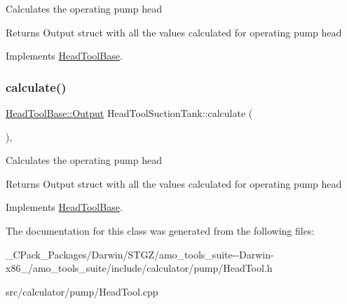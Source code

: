 Calculates the operating pump head \begin{DoxyReturn}{Returns}
Output struct with all the values calculated for operating pump head 
\end{DoxyReturn}


Implements \hyperlink{class_head_tool_base_a82024c0ce01699aa24509c964267c392}{Head\+Tool\+Base}.

\mbox{\label{class_head_tool_suction_tank_ad91b31b9f524b9892da26e5ecb9e191e}} 
\subsubsection{\texorpdfstring{calculate()}{calculate()}\hspace{0.1cm}{\footnotesize\ttfamily [3/3]}}
{\footnotesize\ttfamily \hyperlink{struct_head_tool_base_1_1_output}{Head\+Tool\+Base\+::\+Output} Head\+Tool\+Suction\+Tank\+::calculate (\begin{DoxyParamCaption}{ }\end{DoxyParamCaption})\hspace{0.3cm}{\ttfamily [override]}, {\ttfamily [virtual]}}

Calculates the operating pump head \begin{DoxyReturn}{Returns}
Output struct with all the values calculated for operating pump head 
\end{DoxyReturn}


Implements \hyperlink{class_head_tool_base_a82024c0ce01699aa24509c964267c392}{Head\+Tool\+Base}.



The documentation for this class was generated from the following files\+:\begin{DoxyCompactItemize}
\item 
\+\_\+\+C\+Pack\+\_\+\+Packages/\+Darwin/\+S\+T\+G\+Z/amo\+\_\+tools\+\_\+suite-\/-\/\+Darwin-\/x86\+\_/amo\+\_\+tools\+\_\+suite/include/calculator/pump/Head\+Tool.\+h\item 
src/calculator/pump/Head\+Tool.\+cpp\end{DoxyCompactItemize}
